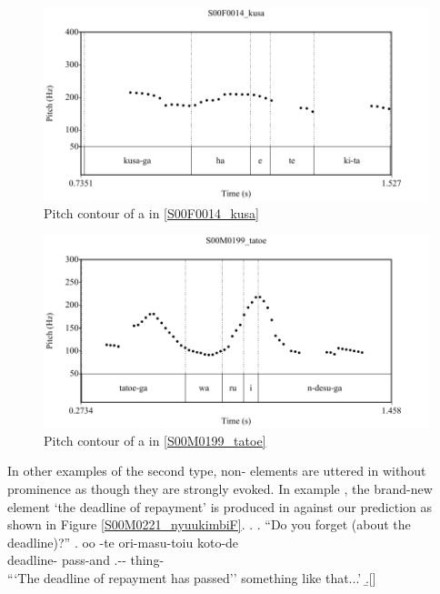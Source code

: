 \begin{figure}
	\begin{center}
	\includegraphics[width=.5\textwidth]{sounds/S00F0014_kusa.pdf}
	\caption{Pitch contour of a in \ref{S00F0014_kusa}}
	\label{S00F0014_kusaF}
	\end{center}
\end{figure}
\begin{figure}
	\begin{center}
	\includegraphics[width=.5\textwidth]{sounds/S00M0199_tatoe.pdf}
	\caption{Pitch contour of a in \ref{S00M0199_tatoe}}
	\label{S00M0199_tatoeF}
	\end{center}
\end{figure}
%
In other examples of the second type,
non- elements are uttered in  without prominence
as though they are strongly evoked.
In example \Next,
the brand-new element  `the deadline of repayment' is produced in  against our prediction
as shown in Figure \ref{S00M0221_nyuukimbiF}.
%
\ex.\label{S00M0221_nyuukimbi}
 \a. ``Do you forget (about the deadline)?''
 \bg. oo \tp{\dvline}  \tp{\dvline} -te ori-masu-toiu koto-de \tp{\dvline} \\
       {} deadline- {} pass-and .-- thing- \\
      ```The deadline of repayment has passed'' something like that...'
  \b.[] 

